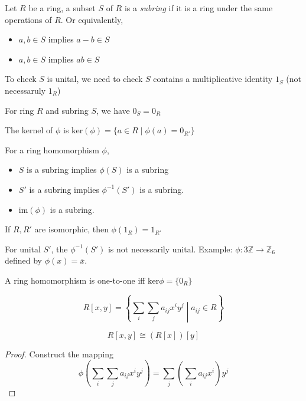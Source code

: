 \begin{definition}[Subring]
Let $R$ be a ring, a subset $S$ of $R$ is a \emph{subring} if it is a ring under the same operations of $R$. Or equivalently,
\begin{itemize}
\item
$a,b\in S$ implies $a-b\in S$
\item
$a,b\in S$ implies $ab\in S$
\end{itemize}
To check $S$ is unital, we need to check $S$ contains a multiplicative identity $1_S$ (not necessaruly $1_R$)
\end{definition}
\begin{proposition}
For ring $R$ and subring $S$, we have $0_S=0_R$
\end{proposition}

\begin{definition}[Kernel]
The kernel of $\phi$ is $\mbox{ker}(\phi)=\{a\in R\mid \phi(a)=0_{R'}\}$
\end{definition}
\begin{proposition}
For a ring homomorphism $\phi$,
\begin{itemize}
\item
$S$ is a subring implies $\phi(S)$ is a subring
\item
$S'$ is a subring implies $\phi^{-1}(S')$ is a subring.
\item
$\mbox{im}(\phi)$ is a subring.
\end{itemize}
\end{proposition}
\begin{corollary}
If $R,R'$ are isomorphic, then $\phi(1_R)=1_{R'}$
\end{corollary}
\begin{remark}
For unital $S'$, the $\phi^{-1}(S')$ is not necessarily unital. Example: $\phi:3\mathbb{Z}\to\mathbb{Z}_6$ defined by $\phi(x)=\bar x$.
\end{remark}
\begin{proposition}
A ring homomorphism is one-to-one iff $\mbox{ker}\phi=\{0_R\}$
\end{proposition}
\begin{definition}
\[
R[x,y]=\left\{
\sum_i\sum_ja_{ij}x^iy^j\middle|
a_{ij}\in R
\right\}
\]
\end{definition}
\begin{proposition}
\[
R[x,y]\cong (R[x])[y]
\]
\end{proposition}
\begin{proof}
Construct the mapping 
\[
\phi\left(\sum_i\sum_ja_{ij}x^iy^j\right)=\sum_j\left(\sum_{i}a_{ij}x^i\right)y^j
\]
\end{proof}
